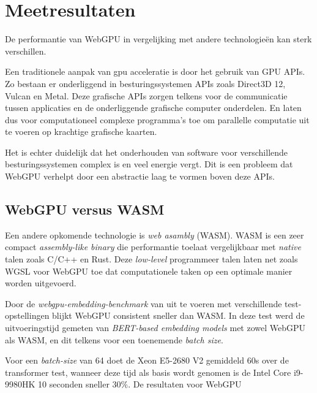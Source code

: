 \chapter{Meetresultaten}%
\label{ch:benchmarks}

De performantie van WebGPU in vergelijking met andere technologieën kan sterk verschillen. 

Een traditionele aanpak van gpu acceleratie is door het gebruik van GPU APIs. Zo bestaan er onderliggend in besturingssystemen APIs zoals Direct3D 12, Vulcan en Metal. Deze grafische APIs zorgen telkens voor de communicatie tussen applicaties en de onderliggende grafische computer onderdelen. En laten dus voor computationeel complexe programma's toe om parallelle computatie uit te voeren op krachtige grafische kaarten.

\bigbreak{}

Het is echter duidelijk dat het onderhouden van software voor verschillende besturingssystemen complex is en veel energie vergt. Dit is een probleem dat WebGPU verhelpt door een abstractie laag te vormen boven deze APIs. \autocite{Wallez2023} 

\break{}

\section*{WebGPU versus WASM}

Een andere opkomende technologie is  \textit{web asambly} (WASM). WASM is een zeer compact \textit{assembly-like binary} die performantie toelaat vergelijkbaar met \textit{native} talen zoals C/C++ en Rust. \autocite{Steiner2023} Deze \textit{low-level} programmeer talen laten net zoals WGSL voor WebGPU toe dat computationele taken op een optimale manier worden uitgevoerd.

\bigbreak{}



Door de \textit{webgpu-embedding-benchmark} van \textcite{Lochner2024} uit te voeren met verschillende test-opstellingen blijkt WebGPU consistent sneller dan WASM. In deze test werd de uitvoeringstijd gemeten van \textit{BERT-based embedding models} met zowel WebGPU als WASM, en dit telkens voor een toenemende \textit{batch size}.

\bigbreak{}

Voor een \textit{batch-size} van 64 doet de Xeon E5-2680 V2 gemiddeld 60s over de transformer test, wanneer deze tijd als basis wordt genomen is de Intel Core i9-9980HK 10 seconden sneller \(30\%\). De resultaten voor WebGPU 

